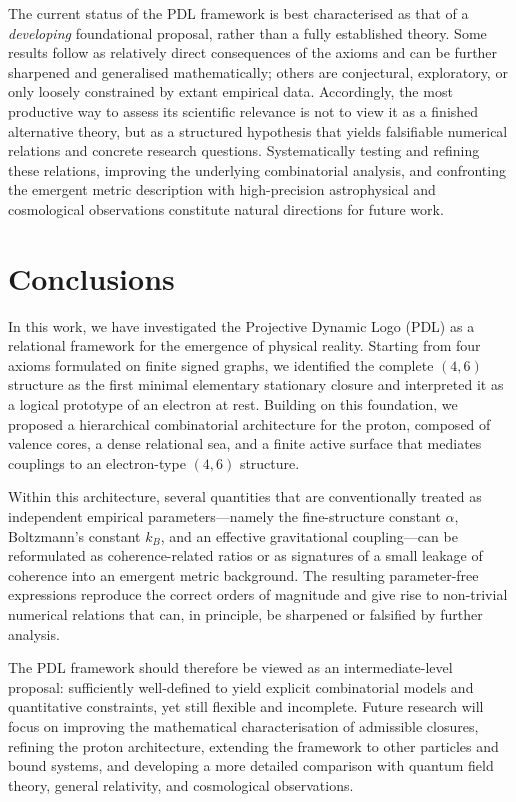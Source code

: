 \documentclass[11pt,a4paper]{article}
\begin{document}
The current status of the PDL framework is best characterised as that of a \emph{developing} foundational proposal, rather than a fully established theory. Some results follow as relatively direct consequences of the axioms and can be further sharpened and generalised mathematically; others are conjectural, exploratory, or only loosely constrained by extant empirical data. Accordingly, the most productive way to assess its scientific relevance is not to view it as a finished alternative theory, but as a structured hypothesis that yields falsifiable numerical relations and concrete research questions. Systematically testing and refining these relations, improving the underlying combinatorial analysis, and confronting the emergent metric description with high-precision astrophysical and cosmological observations constitute natural directions for future work.

\section{Conclusions}

In this work, we have investigated the Projective Dynamic Logo (PDL) as a relational framework for the emergence of physical reality. Starting from four axioms formulated on finite signed graphs, we identified the complete \((4,6)\) structure as the first minimal elementary stationary closure and interpreted it as a logical prototype of an electron at rest. Building on this foundation, we proposed a hierarchical combinatorial architecture for the proton, composed of valence cores, a dense relational sea, and a finite active surface that mediates couplings to an electron-type \((4,6)\) structure.

Within this architecture, several quantities that are conventionally treated as independent empirical parameters—namely the fine-structure constant \(\alpha\), Boltzmann’s constant \(k_B\), and an effective gravitational coupling—can be reformulated as coherence-related ratios or as signatures of a small leakage of coherence into an emergent metric background. The resulting parameter-free expressions reproduce the correct orders of magnitude and give rise to non-trivial numerical relations that can, in principle, be sharpened or falsified by further analysis.

The PDL framework should therefore be viewed as an intermediate-level proposal: sufficiently well-defined to yield explicit combinatorial models and quantitative constraints, yet still flexible and incomplete. Future research will focus on improving the mathematical characterisation of admissible closures, refining the proton architecture, extending the framework to other particles and bound systems, and developing a more detailed comparison with quantum field theory, general relativity, and cosmological observations.
\end{document}
